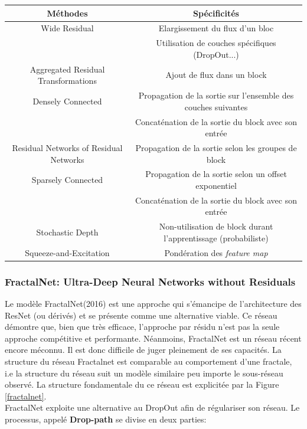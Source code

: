 \hspace{-2.5cm}\begin{tabular}{|c|c|}
 \hline
  Méthodes & Spécificités\\
  \hline
  Wide Residual & Elargissement du flux d'un bloc\\
  & Utilisation de couches spécifiques (DropOut...)\\
  \hline
  Aggregated Residual Transformations & Ajout de flux dans un block \\
  \hline
  Densely Connected &  Propagation de la sortie sur l'ensemble des couches suivantes\\
  & Concaténation de la sortie du block avec son entrée\\
  \hline
  Residual Networks of Residual Networks & Propagation de la sortie selon les groupes de block\\
  \hline
  Sparsely Connected & Propagation de la sortie selon un offset exponentiel\\
  & Concaténation de la sortie du block avec son entrée\\
  \hline
  Stochastic Depth & Non-utilisation de block durant l'apprentissage (probabiliste)\\
  \hline
  Squeeze-and-Excitation & Pondération des \textit{feature map}\\
  \hline
\end{tabular}

\subsubsection{FractalNet: Ultra-Deep Neural Networks without Residuals}
Le modèle FractalNet\cite{fractalnet}(2016) est une approche qui s'émancipe de l'architecture des ResNet (ou dérivés) et se présente comme une alternative viable. Ce réseau démontre que, bien que très efficace, l'approche par résidu n'est pas la seule approche compétitive et performante. Néanmoins, FractalNet est un réseau récent encore méconnu. Il est donc difficile de juger pleinement de ses capacités. La structure du réseau Fractalnet est comparable au comportement d'une fractale, i.e la structure du réseau suit un modèle similaire peu importe le sous-réseau observé. La structure fondamentale du ce réseau est explicitée par la Figure \ref{fractalnet}.\\

\noindent FractalNet exploite une alternative au DropOut afin de régulariser son réseau. Le processus, appelé \textbf{Drop-path} se divise en deux parties:

